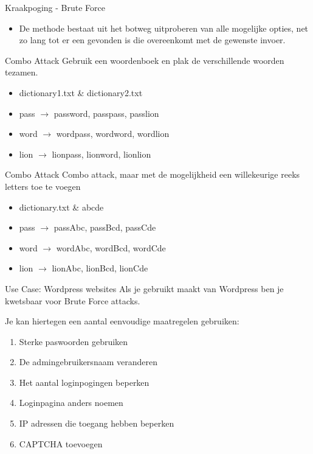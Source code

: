 \documentclass{beamer}
\begin{document}
\begin{frame}{Kraakpoging - Brute Force}

\begin{itemize}
	\item 	 De methode bestaat uit het botweg uitproberen van alle mogelijke opties, net zo lang tot er een gevonden is die overeenkomt met de gewenste invoer.
\end{itemize}
	
\end{frame}

\begin{frame}{Combo Attack}
	Gebruik een woordenboek en plak de verschillende woorden tezamen.
	\begin{itemize}
		\item dictionary1.txt \& dictionary2.txt
		\item pass $ \rightarrow $ password, passpass, passlion
		\item word $ \rightarrow $ wordpass, wordword, wordlion
		\item lion $ \rightarrow $ lionpass, lionword, lionlion 
	\end{itemize}
\end{frame}

\begin{frame}{Combo Attack}
Combo attack, maar met de mogelijkheid een willekeurige reeks letters toe te voegen
	\begin{itemize}
	\item dictionary.txt \& abcde
	\item pass $ \rightarrow $ passAbc, passBcd, passCde
	\item word $ \rightarrow $ wordAbc, wordBcd, wordCde
	\item lion $ \rightarrow $ lionAbc, lionBcd, lionCde
	\end{itemize}
\end{frame}

\begin{frame}{Use Case: Wordpress websites}
	Als je gebruikt maakt van Wordpress ben je kwetsbaar voor Brute Force attacks.
	
	Je kan hiertegen een aantal eenvoudige maatregelen gebruiken:
	\begin{enumerate}
		\item Sterke paswoorden gebruiken
		\item De admingebruikersnaam veranderen
		\item Het aantal loginpogingen beperken
		\item Loginpagina anders noemen
		\item IP adressen die toegang hebben beperken
		\item CAPTCHA toevoegen
	\end{enumerate}
\end{frame}
\end{document}
